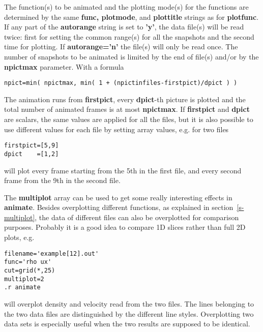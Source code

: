    The function(s) to be animated and the plotting mode(s) for the functions 
   are determined by the same {\bf func, plotmode}, and {\bf plottitle} 
   strings as for {\bf plotfunc}. If any part of the 
   {\bf autorange} string is set to {\bf 'y'},
   the data file(s) will be read twice: first for setting the common range(s) 
   for all the snapshots and the second time for plotting.
   If {\bf autorange='n'} the file(s) will only be read once.
   The number of snapshots to be animated is limited by the end of 
   file(s) and/or by the {\bf npictmax} parameter. With a formula
\begin{verbatim}
npict=min( npictmax, min( 1 + (npictinfiles-firstpict)/dpict ) )
\end{verbatim}
   The animation runs from {\bf firstpict}, every {\bf dpict}-th picture is
   plotted and the total number of animated frames is at most {\bf npictmax}. 
   If {\bf firstpict} and {\bf dpict} are scalars, the same values are
   applied for all the files, but it is also possible to use different
   values for each file by setting array values, e.g. for two files
\begin{verbatim}
firstpict=[5,9]
dpict    =[1,2]
\end{verbatim}
   will plot every frame starting from the 5th in the first file,
   and every second frame from the 9th in the second file.

   The {\bf multiplot} array can be used to get some really interesting
   effects in {\bf animate}. Besides overplotting different functions,
   as explained in section~\ref{s-multiplot}, 
   the data of different files can also
   be overplotted for comparison purposes.
   Probably it is a good idea to compare 1D slices rather than full 2D plots,
   e.g. 
\begin{verbatim}
filename='example[12].out'
func='rho ux'
cut=grid(*,25)
multiplot=2
.r animate
\end{verbatim}
   will overplot density and velocity read from the two files. 
   The lines belonging to the two data files are distinguished by
   the different line styles. Overplotting two data sets is
   especially useful when the two results are supposed to be identical.

